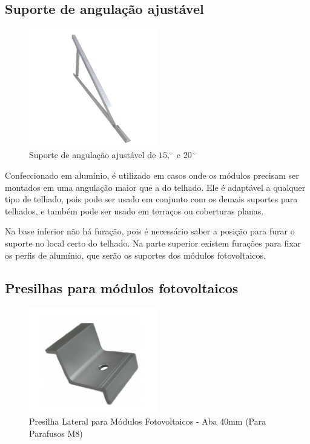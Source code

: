 \subsection{Suporte de angulação ajustável}

\begin{figure}[h]
\centering
\includegraphics[width=0.5\textwidth]{figuras/angulacao.PNG}
\caption{Suporte de angulação ajustável de $15,^{\circ}$ e $20\,^{\circ}$}
\end{figure}

Confeccionado em alumínio, é utilizado em casos onde os módulos precisam ser montados em uma angulação maior que a do telhado. Ele é adaptável a qualquer tipo de telhado, pois pode ser usado em conjunto com os demais suportes para telhados, e também pode ser usado em terraços ou coberturas planas.

\par Na base inferior não há furação, pois é necessário saber a posição para furar o suporte no local certo do telhado. Na parte superior existem furações para fixar os perfis de alumínio, que serão os suportes dos módulos fotovoltaicos.

\subsection{Presilhas para módulos fotovoltaicos}

\begin{figure}[h]
\centering
\includegraphics[width=0.5\textwidth]{figuras/presilha.PNG}
\caption{Presilha Lateral para Módulos Fotovoltaicos - Aba 40mm (Para Parafusos M8)}
\end{figure}

